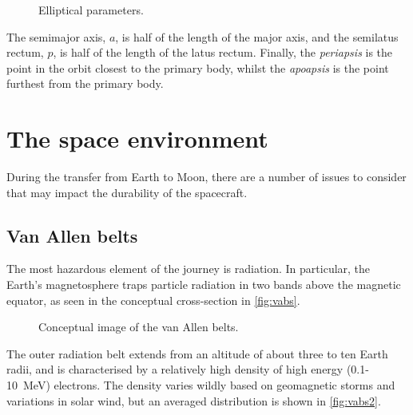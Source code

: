 \begin{figure} 
\centering
\def\svgwidth{0.6\textwidth}

\caption{Elliptical parameters.} \label{fig:ellipse}
\end{figure}

The semimajor axis, $a$, is half of the length of the major axis, and the semilatus rectum, $p$, is half of the length of the latus rectum. Finally, the \emph{periapsis} is the point in the orbit closest to the primary body, whilst the \emph{apoapsis} is the point furthest from the primary body.


\section{The space environment} \label{sec:Environment}

During the transfer from Earth to Moon, there are a number of issues to consider that may impact the durability of the spacecraft.

\subsection{Van Allen belts} \label{sub:VABs}

The most hazardous element of the journey is radiation. In particular, the Earth's magnetosphere traps particle radiation in two bands above the magnetic equator, as seen in the conceptual cross-section in \autoref{fig:vabs}. 

\begin{figure}
\centering
\def\svgwidth{\figurewidth}

\caption{Conceptual image of the van Allen belts.} \label{fig:vabs}
\end{figure}

The outer radiation belt extends from an altitude of about three to ten Earth radii, and is characterised by a relatively high density of high energy (0.1-10~MeV) electrons. The density varies wildly based on geomagnetic storms and variations in solar wind, but an averaged distribution is shown in \autoref{fig:vabs2}.


